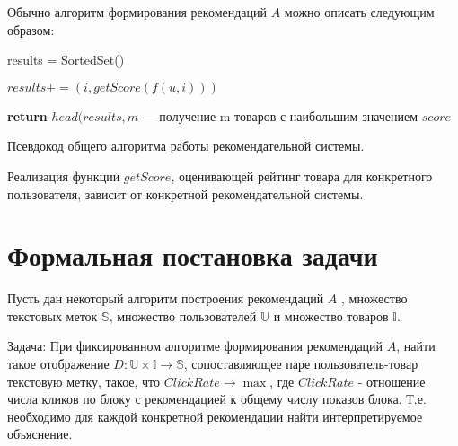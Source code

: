 \documentclass[12pt,a4paper]{report}
\begin{document}
Обычно алгоритм формирования рекомендаций $A$ можно описать следующим образом:


\begin{algorithm}[H]
\SetAlgoLined
{}

results = SortedSet()

 {
	
	$results += (i, getScore(f(u, i)))$
	
}

\textbf{return} $head(results, m$ --- получение m товаров с наибольшим значением $score$

\caption{Псевдокод общего алгоритма работы рекомендательной системы.}
\label{alg:GENERALRS}
\end{algorithm}

Реализация функции $getScore$, оценивающей рейтинг товара для конкретного пользователя, зависит от конкретной рекомендательной системы.

\section{Формальная постановка задачи}
Пусть дан некоторый алгоритм построения рекомендаций $A$ ,  множество текстовых меток $\mathbb{S}$, множество пользователей $\mathbb{U}$ и множество товаров $\mathbb{I}$.

Задача: При фиксированном алгоритме формирования рекомендаций $A$,
 найти такое отображение $D: \mathbb{U} \times \mathbb{I} \to \mathbb{S}$, сопоставляющее паре пользователь-товар  текстовую метку, такое, что  $ClickRate \to \max$, где $ClickRate$ - отношение числа кликов по блоку с рекомендацией к общему числу показов блока. Т.е. необходимо для каждой конкретной рекомендации найти 
 интерпретируемое объяснение. 
\end{document}
